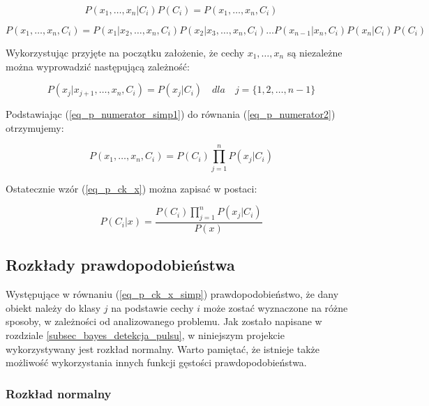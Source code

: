 	\begin{equation}
	\label{eq_p_numerator1}
		P(x_1, \dots , x_n | C_i)P(C_i) = P(x_1, \dots, x_n, C_i)
	\end{equation}

	\begin{equation}
	\label{eq_p_numerator2}
		P(x_1, \dots, x_n, C_i) = P(x_1 | x_2 , \dots , x_n, C_i)P(x_2 | x_3, \dots , x_n, 	C_i) \dots P(x_{n-1} | x_n, C_i)P(x_n | C_i)P(C_i)
	\end{equation}
	
Wykorzystując przyjęte na początku założenie, że cechy ${x_1, \dots, x_n}$ są niezależne można wyprowadzić następującą zależność:

	\begin{equation}
	\label{eq_p_numerator_simp1}
		P(x_j | x_{j+1}, \dots , x_n, C_i) = P(x_j | C_i) \quad dla \quad j = \{1, 2, \dots, n-1\}
	\end{equation}

Podstawiając (\ref{eq_p_numerator_simp1}) do równania (\ref{eq_p_numerator2}) otrzymujemy:
	
	\begin{equation}
	\label{eq_p_numerator_simp2}
		P(x_1, \dots, x_n, C_i) = P(C_i) \prod_{j = 1}^n P(x_j | C_i)
	\end{equation}

Ostatecznie wzór (\ref{eq_p_ck_x}) można zapisać w postaci:

	\begin{equation}
	\label{eq_p_ck_x_simp}
		P(C_i | x) = \frac{P(C_i) \prod_{j = 1}^n P(x_j | C_i)}{P(x)}
	\end{equation}


\subsection{Rozkłady prawdopodobieństwa}
\label{sec_rozklady}

Występujące w równaniu (\ref{eq_p_ck_x_simp}) prawdopodobieństwo, że dany obiekt należy do klasy $j$ na podstawie cechy $i$ może zostać wyznaczone na różne sposoby, w zależności od analizowanego problemu. Jak zostało napisane w rozdziale \ref{subsec_bayes_detekcja_pulsu}, w niniejszym projekcie wykorzystywany jest rozkład normalny. Warto pamiętać, że istnieje także możliwość wykorzystania innych funkcji gęstości prawdopodobieństwa. 

\subsubsection{Rozkład normalny}
\label{subsec_gauss}


